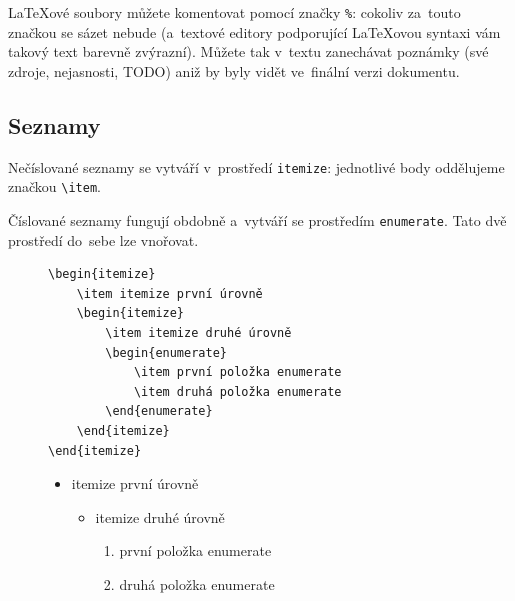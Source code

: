 \LaTeX{}ové soubory můžete komentovat pomocí značky \verb|%|: cokoliv za~touto značkou se sázet nebude (a~textové editory podporující \LaTeX{}ovou syntaxi vám takový text barevně zvýrazní).
Můžete tak v~textu zanechávat poznámky (své zdroje, nejasnosti, TODO) aniž by byly vidět ve~finální verzi dokumentu.

\subsection{Seznamy}
\label{sec:seznamy}

Nečíslované seznamy se vytváří v~prostředí \verb|itemize|:
jednotlivé body oddělujeme značkou \verb|\item|.

Číslované seznamy fungují obdobně a~vytváří se prostředím \verb|enumerate|.
Tato dvě prostředí do~sebe lze vnořovat.

\begin{figure}[ht]
\begin{mdframed}
\onehalfspacing
\begin{verbatim}
\begin{itemize}
    \item itemize první úrovně
    \begin{itemize}
        \item itemize druhé úrovně
        \begin{enumerate}
            \item první položka enumerate
            \item druhá položka enumerate
        \end{enumerate}
    \end{itemize}
\end{itemize}
\end{verbatim}

\vspace*{1em}

\begin{itemize}
    \item itemize první úrovně
    \begin{itemize}
        \item itemize druhé úrovně
        \begin{enumerate}
            \item první položka enumerate
            \item druhá položka enumerate
        \end{enumerate}
    \end{itemize}
\end{itemize}
\end{mdframed}
\end{figure}
\FloatBarrier

